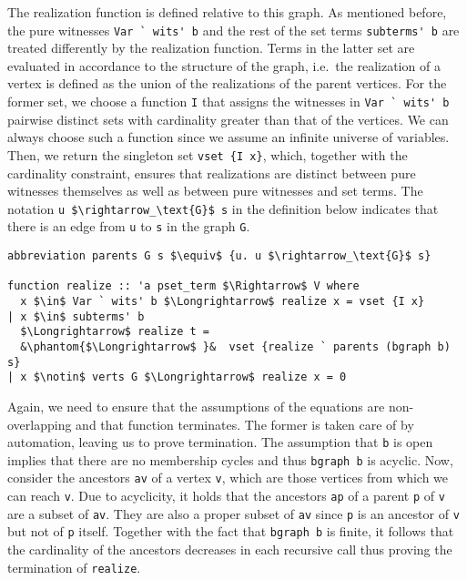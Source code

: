 \documentclass[sigplan,10pt,anonymous,review]{acmart}
\begin{document}
The realization function is defined relative to this graph.
As mentioned before, the pure witnesses \lstinline!Var ` wits' b! and the rest of the set terms \lstinline!subterms' b! are treated differently by the realization function.
Terms in the latter set are evaluated in accordance to the structure of the graph, i.e.\ the realization of a vertex is defined as the union of the realizations of the parent vertices. 
For the former set, we choose a function \lstinline!I! that assigns the witnesses in \lstinline!Var ` wits' b! pairwise distinct sets with cardinality greater than that of the vertices.
We can always choose such a function since we assume an infinite universe of variables.
Then, we return the singleton set \lstinline!vset {I x}!, which, together with the cardinality constraint, ensures that realizations are distinct between pure witnesses themselves as well as between pure witnesses and set terms.  
The notation \lstinline!u $\rightarrow_\text{G}$ s! in the definition below indicates that there is an edge from \lstinline!u! to \lstinline!s! in the graph \lstinline!G!.
\begin{lstlisting}
abbreviation parents G s $\equiv$ {u. u $\rightarrow_\text{G}$ s}

function realize :: 'a pset_term $\Rightarrow$ V where
  x $\in$ Var ` wits' b $\Longrightarrow$ realize x = vset {I x}
| x $\in$ subterms' b
  $\Longrightarrow$ realize t =
  &\phantom{$\Longrightarrow$ }&  vset {realize ` parents (bgraph b) s}
| x $\notin$ verts G $\Longrightarrow$ realize x = 0
\end{lstlisting}

Again, we need to ensure that the assumptions of the equations are non-overlapping and that function terminates.
The former is taken care of by automation, leaving us to prove termination.
The assumption that \lstinline!b! is open implies that there are no membership cycles and thus \lstinline!bgraph b! is acyclic.
Now, consider the ancestors \lstinline!av! of a vertex \lstinline!v!, which are those vertices from which we can reach \lstinline!v!.
Due to acyclicity, it holds that the ancestors \lstinline!ap! of a parent \lstinline!p! of \lstinline!v! are a subset of \lstinline!av!.
They are also a proper subset of \lstinline!av! since \lstinline!p! is an ancestor of \lstinline!v! but not of \lstinline!p! itself.
Together with the fact that \lstinline!bgraph b! is finite, it follows that the cardinality of the ancestors decreases in each recursive call thus proving the termination of \lstinline!realize!.
\end{document}
